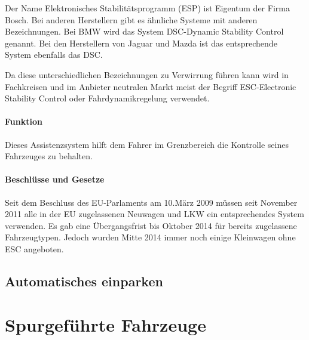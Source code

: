 Der Name Elektronisches Stabilitätsprogramm (ESP) ist Eigentum der Firma Bosch. Bei anderen Herstellern gibt es ähnliche Systeme mit anderen Bezeichnungen. Bei BMW wird das System DSC-Dynamic Stability Control genannt. Bei den Herstellern von Jaguar und Mazda ist das entsprechende System ebenfalls das DSC.

Da diese unterschiedlichen Bezeichnungen zu Verwirrung führen kann wird in Fachkreisen und im Anbieter neutralen Markt meist der Begriff ESC-Electronic Stability Control oder Fahrdynamikregelung verwendet. 
\paragraph{Funktion}Dieses Assistenzsystem hilft dem Fahrer im Grenzbereich die Kontrolle seines Fahrzeuges zu behalten. 

\paragraph{Beschlüsse und Gesetze} Seit dem Beschluss des EU-Parlaments am 10.März 2009 müssen seit November 2011 alle in der EU zugelassenen Neuwagen und LKW ein entsprechendes System verwenden. Es gab eine Übergangsfrist bis Oktober 2014 für bereits zugelassene Fahrzeugtypen. Jedoch wurden Mitte 2014 immer noch einige Kleinwagen ohne ESC angeboten. 


\subsection{Automatisches einparken}

\section{Spurgeführte Fahrzeuge}